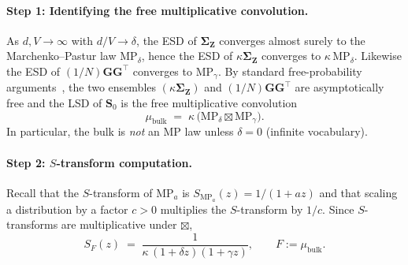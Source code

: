 \documentclass{article}
\def\mG{{\bm{G}}}
\def\mS{{\bm{S}}}
\def\mZ{{\bm{Z}}}
\def\mSigma{{\bm{\Sigma}}}
\begin{document}
\paragraph{Step 1: Identifying the free multiplicative convolution.}
As $d,V\to\infty$ with $d/V\to\delta$, the ESD of $\mSigma_\mZ$ converges almost surely to the Marchenko--Pastur law $\mathrm{MP}_\delta$, hence the ESD of $\kappa\mSigma_\mZ$ converges to $\kappa\,\mathrm{MP}_\delta$. Likewise the ESD of $(1/N)\mG\mG^\top$ converges to $\mathrm{MP}_\gamma$. By standard free-probability arguments~\citep{nica2006lectures}, the two ensembles $(\kappa\mSigma_\mZ)$ and $(1/N)\mG\mG^\top$ are asymptotically free and the LSD of $\mS_0$ is the free multiplicative convolution
\begin{equation}\label{eq:bulk_free_conv_app}
    \mu_{\mathrm{bulk}} \;=\; \kappa\,\big(\mathrm{MP}_\delta \boxtimes \mathrm{MP}_\gamma\big).
\end{equation}
In particular, the bulk is \emph{not} an MP law unless $\delta=0$ (infinite vocabulary).

\paragraph{Step 2: $S$-transform computation.}
Recall that the $S$-transform of $\mathrm{MP}_a$ is $S_{\mathrm{MP}_a}(z)=1/(1+az)$ and that scaling a distribution by a factor $c>0$ multiplies the $S$-transform by $1/c$. Since $S$-transforms are multiplicative under $\boxtimes$,
\begin{equation}\label{eq:Stransform_F}
    S_F(z) \;=\; \frac{1}{\kappa\,(1+\delta z)(1+\gamma z)},
    \qquad F := \mu_{\mathrm{bulk}}.
\end{equation}
\end{document}
